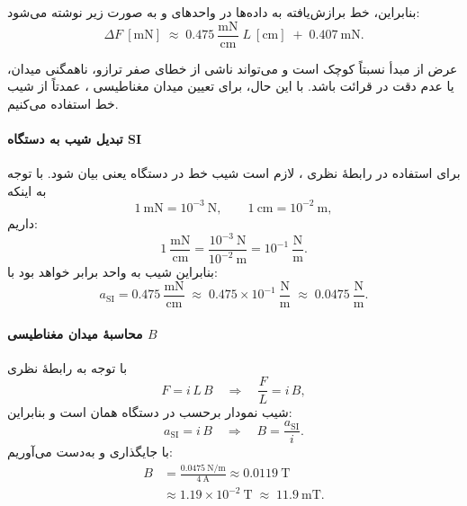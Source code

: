 \documentclass[a4paper, 11pt]{article}
\begin{document}
بنابراین، خط برازش‌یافته به داده‌ها در واحدهای  و  به صورت زیر نوشته می‌شود:
\begin{equation}
\Delta F~[\mathrm{mN}] \;\approx\; 0.475~\frac{\mathrm{mN}}{\mathrm{cm}}\; L~[\mathrm{cm}] \;+\; 0.407~\mathrm{mN}.
\end{equation}

عرض از مبدأ نسبتاً کوچک است و می‌تواند ناشی از خطای صفر ترازو، ناهمگنی میدان، یا عدم دقت در قرائت باشد. با این حال، برای تعیین میدان مغناطیسی ، عمدتاً از شیب خط استفاده می‌کنیم.

\paragraph{تبدیل شیب به دستگاه SI}
برای استفاده در رابطهٔ نظری ، لازم است شیب خط در دستگاه  یعنی  بیان شود. با توجه به اینکه
\[
1~\mathrm{mN} = 10^{-3}~\mathrm{N}, 
\qquad
1~\mathrm{cm} = 10^{-2}~\mathrm{m},
\]
داریم:
\begin{equation}
1~\frac{\mathrm{mN}}{\mathrm{cm}} = \frac{10^{-3}~\mathrm{N}}{10^{-2}~\mathrm{m}} = 10^{-1}~\frac{\mathrm{N}}{\mathrm{m}}.
\end{equation}
بنابراین شیب به واحد  برابر خواهد بود با:
\begin{equation}
a_{\mathrm{SI}} = 0.475~\frac{\mathrm{mN}}{\mathrm{cm}} 
\;\approx\; 0.475\times 10^{-1}~\frac{\mathrm{N}}{\mathrm{m}}
\;\approx\; 0.0475~\frac{\mathrm{N}}{\mathrm{m}}.
\end{equation}

\paragraph{محاسبهٔ میدان مغناطیسی \texorpdfstring{$B$}{B}}
با توجه به رابطهٔ نظری
\begin{equation}
F = i\,L\,B \quad\Rightarrow\quad \frac{F}{L} = i\,B,
\end{equation}
شیب نمودار  برحسب  در دستگاه  همان  است و بنابراین:
\begin{equation}
a_{\mathrm{SI}} = i\,B \quad\Rightarrow\quad B = \frac{a_{\mathrm{SI}}}{i}.
\end{equation}
با جایگذاری  و  به‌دست می‌آوریم:
\begin{align}
B &= \frac{0.0475~\mathrm{N/m}}{4~\mathrm{A}} 
   \approx 0.0119~\mathrm{T} \\
  &\approx 1.19\times 10^{-2}~\mathrm{T} 
   \;\approx\; 11.9~\mathrm{mT}.
\end{align}
\end{document}
